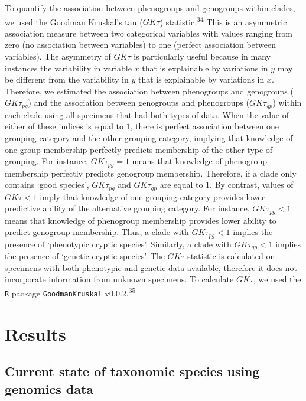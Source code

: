 \documentclass[
  11pt,
]{article}
\begin{document}
To quantify the association between phenogroups and genogroups within clades, we used the Goodman Kruskal's tau (\(GK\tau\)) statistic.\textsuperscript{34} This is an asymmetric association measure between two categorical variables with values ranging from zero (no association between variables) to one (perfect association between variables). The asymmetry of \(GK\tau\) is particularly useful because in many instances the variability in variable \(x\) that is explainable by variations in \(y\) may be different from the variability in \(y\) that is explainable by variations in \(x\). Therefore, we estimated the association between phenogroups and genogroups (\(GK\tau_{pg}\)) and the association between genogroups and phenogroups (\(GK\tau_{gp}\)) within each clade using all specimens that had both types of data. When the value of either of these indices is equal to \(1\), there is perfect association between one grouping category and the other grouping category, implying that knowledge of one group membership perfectly predicts membership of the other type of grouping. For instance, \(GK\tau_{pg}=1\) means that knowledge of phenogroup membership perfectly predicts genogroup membership. Therefore, if a clade only contains `good species', \(GK\tau_{pg}\) and \(GK\tau_{gp}\) are equal to \(1\). By contrast, values of \(GK\tau<1\) imply that knowledge of one grouping category provides lower predictive ability of the alternative grouping category. For instance, \(GK\tau_{pg}<1\) means that knowledge of phenogroup membership provides lower ability to predict genogroup membership. Thus, a clade with \(GK\tau_{pg}<1\) implies the presence of `phenotypic cryptic species'. Similarly, a clade with \(GK\tau_{gp}<1\) implies the presence of `genetic cryptic species'. The \(GK\tau\) statistic is calculated on specimens with both phenotypic and genetic data available, therefore it does not incorporate information from unknown specimens. To calculate \(GK\tau\), we used the \texttt{R} package \texttt{GoodmanKruskal} v0.0.2.\textsuperscript{35}

\hypertarget{results}{%
\section{Results}\label{results}}

\hypertarget{current-state-of-taxonomic-species-using-genomics-data}{%
\subsection{Current state of taxonomic species using genomics data}\label{current-state-of-taxonomic-species-using-genomics-data}}
\end{document}
